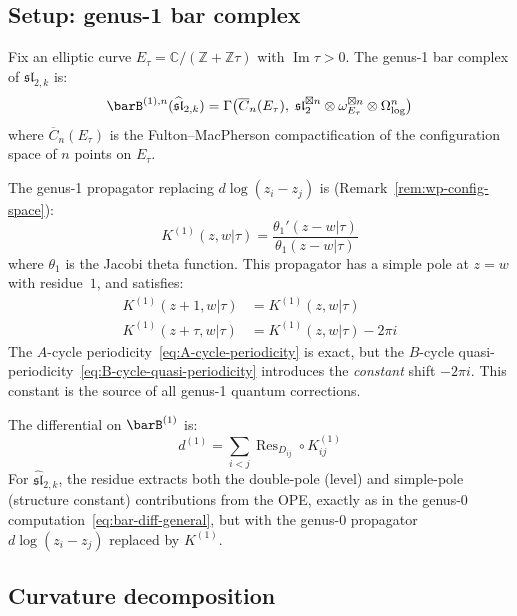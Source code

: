 \subsection{Setup: genus-1 bar complex}

Fix an elliptic curve $E_\tau = \mathbb{C}/(\mathbb{Z}+\mathbb{Z}\tau)$ with $\operatorname{Im}\tau>0$.  The genus-1 bar complex of $\widehat{\mathfrak{sl}}_{2,k}$ is:
\begin{equation}\label{eq:sl2-genus1-bar}
\barB^{(1),n}(\widehat{\mathfrak{sl}}_{2,k}) = \Gamma\bigl(\overline{C}_n(E_\tau),\; \mathfrak{sl}_2^{\boxtimes n} \otimes \omega_{E_\tau}^{\boxtimes n} \otimes \Omega^n_{\log}\bigr)
\end{equation}
where $\overline{C}_n(E_\tau)$ is the Fulton--MacPherson compactification of the configuration space of $n$ points on $E_\tau$.

The genus-1 propagator replacing $d\log(z_i - z_j)$ is (Remark~\ref{rem:wp-config-space}):
\begin{equation}\label{eq:genus1-propagator}
K^{(1)}(z,w|\tau) = \frac{\theta_1'(z-w|\tau)}{\theta_1(z-w|\tau)}
\end{equation}
where $\theta_1$ is the Jacobi theta function.  This propagator has a simple pole at $z=w$ with residue~$1$, and satisfies:
\begin{align}
K^{(1)}(z+1,w|\tau) &= K^{(1)}(z,w|\tau) \label{eq:A-cycle-periodicity} \\
K^{(1)}(z+\tau,w|\tau) &= K^{(1)}(z,w|\tau) - 2\pi i \label{eq:B-cycle-quasi-periodicity}
\end{align}
The $A$-cycle periodicity~\eqref{eq:A-cycle-periodicity} is exact, but the $B$-cycle quasi-periodicity~\eqref{eq:B-cycle-quasi-periodicity} introduces the \emph{constant} shift $-2\pi i$.  This constant is the source of all genus-1 quantum corrections.

The differential on $\barB^{(1)}$ is:
\begin{equation}\label{eq:genus1-diff}
d^{(1)} = \sum_{i<j} \operatorname{Res}_{D_{ij}} \circ K^{(1)}_{ij}
\end{equation}
For $\widehat{\mathfrak{sl}}_{2,k}$, the residue extracts both the double-pole (level) and simple-pole (structure constant) contributions from the OPE, exactly as in the genus-0 computation~\eqref{eq:bar-diff-general}, but with the genus-0 propagator $d\log(z_i-z_j)$ replaced by $K^{(1)}$.

\subsection{Curvature decomposition}

